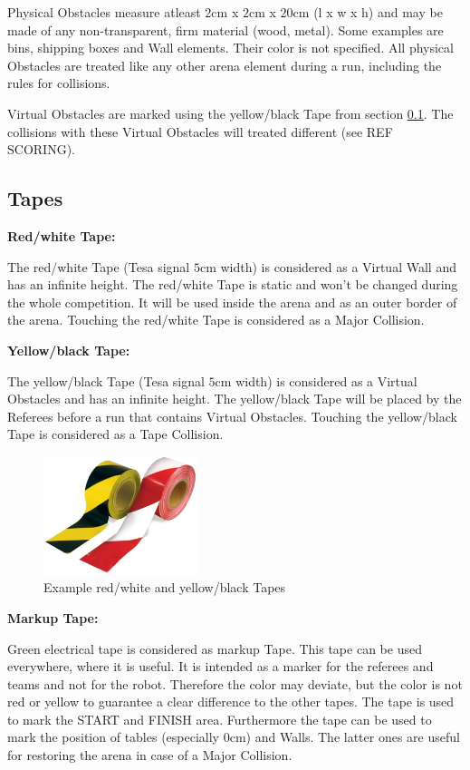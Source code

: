 Physical Obstacles measure atleast $2\si{\centi\meter}$ x $2\si{\centi\meter}$ x $20\si{\centi\meter}$ (l x w x h) and may be made of any non-transparent, firm material (wood, metal). Some examples are bins, shipping boxes and Wall elements. Their color is not specified.
All physical Obstacles are treated like any other arena element during a run, including the rules for collisions.

Virtual Obstacles are marked using the yellow/black Tape from section \ref{subsec:Tapes}. The collisions with these Virtual Obstacles will treated different (see REF SCORING).


\subsection{Tapes}
\label{subsec:Tapes}

\textbf{Red/white Tape:}

The red/white Tape (Tesa signal $5\si{\centi\meter}$ width) is considered as a Virtual Wall and has an infinite height. The red/white Tape is static and won't be changed during the whole competition. It will be used inside the arena and as an outer border of the arena.  Touching the red/white Tape is considered as a Major Collision.

\textbf{Yellow/black Tape:}

The yellow/black Tape (Tesa signal $5\si{\centi\meter}$ width) is considered as a Virtual Obstacles and has an infinite height. The yellow/black Tape will be placed by the Referees before a run that contains Virtual Obstacles. Touching the yellow/black Tape is considered as a Tape Collision.

\begin{figure} [h!]
	\centering
	\includegraphics[width= 0.4\textwidth ]{./images/general_rules/example_barrier_tape}
	\caption{Example red/white and yellow/black Tapes}
	\label{fig:tapes}
\end{figure}

\textbf{Markup Tape:}

Green electrical tape is considered as markup Tape. This tape can be used everywhere, where it is useful. It is intended as a marker for the referees and teams and not for the robot. Therefore the color may deviate, but the color is not red or yellow to guarantee a clear difference to the other tapes. The tape is used to mark the START and FINISH area. Furthermore the tape can be used to mark the position of tables (especially $0\si{\centi\meter}$) and Walls. The latter ones are useful for restoring the arena in case of a Major Collision.


